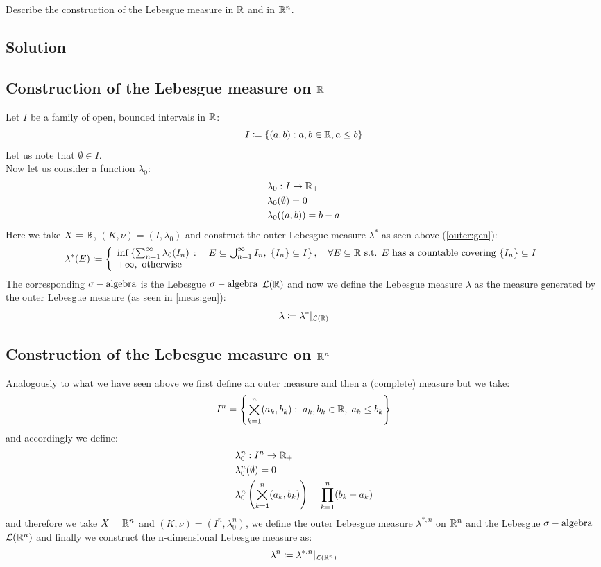 
\question
Describe the construction of the Lebesgue measure in $\mathbb{R}$ and in $\mathbb{R}^n$.

\subsection*{Solution}

\subsection{Construction of the Lebesgue measure on \texorpdfstring{$\mathbb{R}$}{R}}
Let $I$ be a family of open, bounded intervals in $\mathbb{R}$:
\[
    I \coloneqq \{ (a,b) : a,b\in\mathbb{R}, a\leq b \}    
\]
Let us note that $\emptyset\in I$.\\
Now let us consider a function $\lambda_0$:
\begin{align*}
    &\lambda_0 : I \to \mathbb{R}_+ \\
    &\lambda_0 (\emptyset) =0\\
    &\lambda_0 ((a,b)) = b-a
\end{align*}
Here we take $X=\mathbb{R}$, $(K,\nu)=(I,\lambda_0)$ and construct the outer Lebesgue measure $\lambda^*$ as seen above (\ref{outer:gen}):
\[
    \lambda^*(E) \coloneqq \left\{ \begin{array}{l}
        \inf \left\{ \sum_{n=1}^{\infty} \lambda_0(I_n) \, : \quad E\subseteq \bigcup_{n=1}^{\infty} I_n ,\; \{ I_n \}\subseteq I \right\}, \quad \forall E\subseteq\mathbb{R} \text{ s.t. } E \text{ has a countable covering }\{ I_n \}\subseteq I\\
        +\infty, \text{ otherwise}
    \end{array}\right.        
\]
The corresponding $\sigma-\text{algebra}$ is the Lebesgue $\sigma-\text{algebra}$ $\mathcal{L}(\mathbb{R})$ and now we define the Lebesgue measure $\lambda$ as the measure generated by the outer Lebesgue measure (as seen in \ref{meas:gen}):
\[
    \lambda \coloneqq \lambda^*|_{\mathcal{L}(\mathbb{R})}    
\]

\subsection{Construction of the Lebesgue measure on \texorpdfstring{$\mathbb{R}^n$}{Rn}}
Analogously to what we have seen above we first define an outer measure and then a (complete) measure but we take:
\[
    I^n = \left\{ \bigtimes_{k=1}^{n} (a_k,b_k): \; a_k,b_k\in\mathbb{R}, \; a_k\leq b_k  \right\}    
\]
and accordingly we define:
\begin{align*}
    &\lambda_0^n : I^n \to \mathbb{R}_+ \\
    &\lambda_0^n (\emptyset) = 0\\
    &\lambda_0^n \left( \bigtimes_{k=1}^{n} (a_k,b_k) \right) = \prod_{k=1}^n (b_k-a_k)
\end{align*}
and therefore we take $X=\mathbb{R}^n$ and $(K,\nu)=(I^n,\lambda_0^n)$, we define the outer Lebesgue measure $\lambda^{*,n}$ on $\mathbb{R}^n$ and the Lebesgue $\sigma-\text{algebra}$ $\mathcal{L}(\mathbb{R}^n)$ and finally we construct the n-dimensional Lebesgue measure as:
\[
    \lambda^n \coloneqq \lambda^{*,n} |_{\mathcal{L}(\mathbb{R}^n)}    
\]

